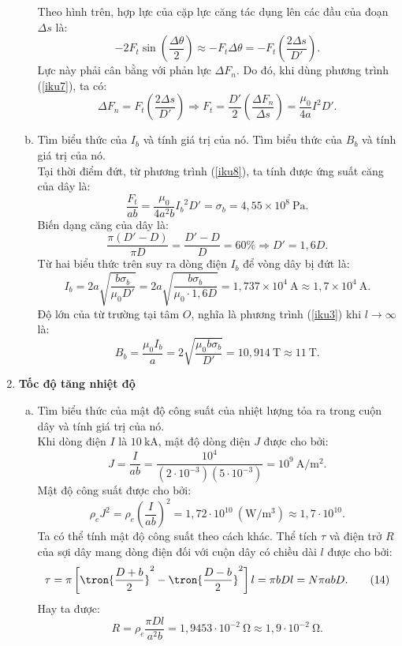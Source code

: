 \begin{loigiai}
\begin{enumerate}[1)]
\begin{enumerate}[a)]
        Theo hình trên, hợp lực của cặp lực căng tác dụng lên các đầu của đoạn $\Delta s$ là: 
        \[-2F_t \sin \left(\dfrac{\Delta \theta}{2} \right) \approx -F_t \Delta \theta =-F_t \left(\dfrac{2\Delta s}{D'} \right ). \tag{7} \label{iku7} \]
        Lực này phải cân bằng với phản lực $\Delta F_n$. Do đó, khi dùng phương trình (\ref{iku7}), ta có:
        \[\Delta F_n = F_t \left( \dfrac{2 \Delta s}{D'} \right ) \Rightarrow F_t =\dfrac{D'}{2} \left ( \dfrac{\Delta F_n}{\Delta s} \right ) =\dfrac{\mu_0}{4a} I^2 D'. \tag{8} \label{iku8}\]
        \item Tìm biểu thức của $I_b$ và tính giá trị của nó. Tìm biểu thức của $B_b$ và tính giá trị của nó.\\
        Tại thời điểm đứt, từ phương trình (\ref{iku8}), ta tính được ứng suất căng của dây là:
        \[ \dfrac{F_t}{ab}=\dfrac{\mu_0}{4a^2 b} {I_b}^2 D'= \sigma_b =4,55\times 10^8 ~\mathrm{Pa}. \tag{9} \]
        Biến dạng căng của dây là:
        \[\dfrac{\pi (D'-D)}{\pi D}= \dfrac{D'-D}{D}=60 \% \Rightarrow D' = 1,6 D. \tag{10} \]
        Từ hai biểu thức trên suy ra dòng điện $I_b$ để vòng dây bị đứt là:
        \[ I_b =2a \sqrt{\dfrac{b \sigma_b}{\mu_0 D'}}=2a\sqrt{\dfrac{b \sigma_b}{\mu_0\cdot 1,6D}}=1,737\times 10^4 ~\mathrm{A} \approx 1,7 \times 10^4 ~\mathrm{A}.  \]
        Độ lớn của từ trường tại tâm $O$, nghĩa là phương trình (\ref{iku3}) khi $l \to \infty$ là:
        \[ B_b =\dfrac{\mu_0 I_b}{a}=2\sqrt{\dfrac{\mu_0 b \sigma_b}{D'}}=10,914 ~\mathrm{T} \approx 11~\mathrm{T}. \tag{11}\]
    \end{enumerate}
    \item \textbf{Tốc độ tăng nhiệt độ}
    \begin{enumerate}[a)]
        \item Tìm biểu thức của mật độ công suất của nhiệt lượng tỏa ra trong cuộn dây và tính giá trị của nó.\\
    Khi dòng điện $I$ là $10 ~\mathrm{kA}$, mật độ dòng điện $J$ được cho bởi:
    \[J=\dfrac{I}{ab}=\dfrac{10^4}{(2\cdot 10^{-3})(5\cdot 10^{-3})} = 10^9 ~\mathrm{A/m^2}. \tag{12}\]
    Mật độ công suất được cho bởi:
    \[ \rho_e J^2=\rho_e \left(\dfrac{I}{ab}\right)^2 = 1,72\cdot 10^{10} ~(\mathrm{W/m^3}) \approx 1,7\cdot 10^{10}. \tag{13}\]
 Ta có thể tính mật độ công suất theo cách khác. Thể tích $\tau$ và điện trở $R$ của sợi dây mang dòng điện đối với cuộn dây có chiều dài $l$ được cho bởi:
 \[\tau =\pi \left[\tron{\dfrac{D+b}{2}}^2-\tron{\dfrac{D-b}{2}}^2 \right]l=\pi b D l=N\pi abD. \tag{14} \label{lili14}\]
 Hay ta được:
 \[R = \rho_e \dfrac{\pi Dl}{a^2 b}=1,9453\cdot 10^{-2} ~\mathrm{\Omega} \approx 1,9 \cdot 10^{-2}~\mathrm{\Omega}. \tag{15} \label{lili15}\]

\end{enumerate}
\end{enumerate}
\end{loigiai}
